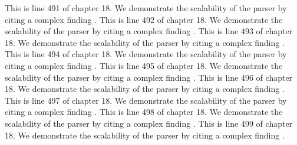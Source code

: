 This is line 491 of chapter 18. We demonstrate the scalability of the parser by citing a complex finding \cite{ref18_491}.
This is line 492 of chapter 18. We demonstrate the scalability of the parser by citing a complex finding \cite{ref18_492}.
This is line 493 of chapter 18. We demonstrate the scalability of the parser by citing a complex finding \cite{ref18_493}.
This is line 494 of chapter 18. We demonstrate the scalability of the parser by citing a complex finding \cite{ref18_494}.
This is line 495 of chapter 18. We demonstrate the scalability of the parser by citing a complex finding \cite{ref18_495}.
This is line 496 of chapter 18. We demonstrate the scalability of the parser by citing a complex finding \cite{ref18_496}.
This is line 497 of chapter 18. We demonstrate the scalability of the parser by citing a complex finding \cite{ref18_497}.
This is line 498 of chapter 18. We demonstrate the scalability of the parser by citing a complex finding \cite{ref18_498}.
This is line 499 of chapter 18. We demonstrate the scalability of the parser by citing a complex finding \cite{ref18_499}.
